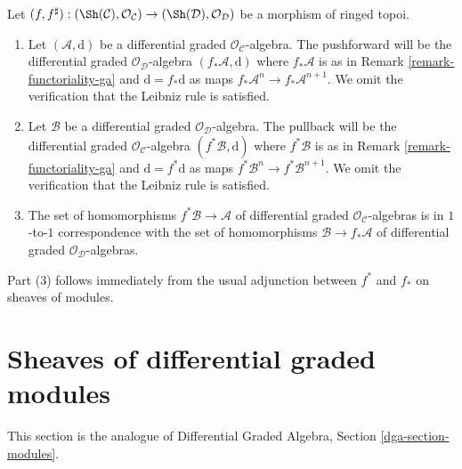 \begin{remark}
\label{remark-functoriality-dga}
Let $(f, f^\sharp) : (\Sh(\mathcal{C}), \mathcal{O}_\mathcal{C})
\to (\Sh(\mathcal{D}), \mathcal{O}_\mathcal{D})$
be a morphism of ringed topoi.
\begin{enumerate}
\item Let $(\mathcal{A}, \text{d})$ be a differential graded
$\mathcal{O}_\mathcal{C}$-algebra. The pushforward will be
the differential graded $\mathcal{O}_\mathcal{D}$-algebra
$(f_*\mathcal{A}, \text{d})$ where $f_*\mathcal{A}$ is as in
Remark \ref{remark-functoriality-ga} and
$\text{d} = f_*\text{d}$ as maps $f_*\mathcal{A}^n \to f_*\mathcal{A}^{n + 1}$.
We omit the verification that the Leibniz rule is satisfied.
\item Let $\mathcal{B}$ be a differential graded
$\mathcal{O}_\mathcal{D}$-algebra. The pullback will be the
differential graded $\mathcal{O}_\mathcal{C}$-algebra
$(f^*\mathcal{B}, \text{d})$ where $f^*\mathcal{B}$ is as in
Remark \ref{remark-functoriality-ga} and
$\text{d} = f^*\text{d}$ as maps $f^*\mathcal{B}^n \to f^*\mathcal{B}^{n + 1}$.
We omit the verification that the Leibniz rule is satisfied.
\item The set of homomorphisms $f^*\mathcal{B} \to \mathcal{A}$
of differential graded $\mathcal{O}_\mathcal{C}$-algebras is in
$1$-to-$1$ correspondence with the set of homomorphisms
$\mathcal{B} \to f_*\mathcal{A}$ of differential graded
$\mathcal{O}_\mathcal{D}$-algebras.
\end{enumerate}
Part (3) follows immediately from the usual adjunction between $f^*$ and $f_*$
on sheaves of modules.
\end{remark}
















\section{Sheaves of differential graded modules}
\label{section-modules}

\noindent
This section is the analogue of
Differential Graded Algebra, Section \ref{dga-section-modules}.

